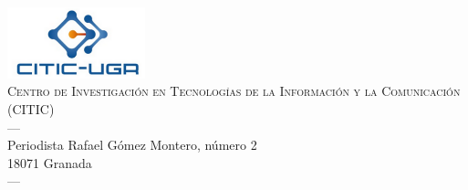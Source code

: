 \begin{titlepage}
\begin{minipage}{\textwidth}
\includegraphics[width=0.3\textwidth]{imagenes/citic.png}\\[0.1cm]
\textsc{Centro de Investigación en Tecnologías de la Información y la Comunicación (CITIC)}\\
\textsc{---}\\
Periodista Rafael Gómez Montero, número 2\\
18071 Granada\\
\textsc{---}\\
\end{minipage}
\end{titlepage}


